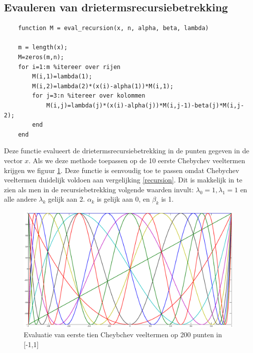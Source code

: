 \documentclass[a4paper, 12pt, titlepage]{report}
\begin{document}
\subsection{Evauleren van drietermsrecursiebetrekking}
\begin{lstlisting}
	function M = eval_recursion(x, n, alpha, beta, lambda)
	
	m = length(x);
	M=zeros(m,n);
	for i=1:m %itereer over rijen
	    M(i,1)=lambda(1);
	    M(i,2)=lambda(2)*(x(i)-alpha(1))*M(i,1);
	    for j=3:n %itereer over kolommen
	        M(i,j)=lambda(j)*(x(i)-alpha(j))*M(i,j-1)-beta(j)*M(i,j-2);
	    end
	end
\end{lstlisting}
Deze functie evalueert de drietermsrecursiebetrekking in de punten gegeven in de vector $x$. Als we deze methode toepassen op de 10 eerste Chebychev veeltermen krijgen we figuur \ref{chebychev}. Deze functie is eenvoudig toe te passen omdat Chebychev veeltermen duidelijk voldoen aan vergelijking \eqref{recursion}. Dit is makkelijk in te zien als men in de recursiebetrekking volgende waarden invult: $\lambda_0=1, \lambda_1=1$ en alle andere $\lambda_k$ gelijk aan 2. $\alpha_k$ is gelijk aan 0, en $\beta_k$ is 1. \\

\begin{figure}[htb]
	\centering
	\includegraphics[width=\textwidth]{chebychev.eps}
	\caption{Evaluatie van eerste tien Cheybchev veeltermen op 200 punten in [-1,1]}
	\label{chebychev}
\end{figure}
\end{document}
